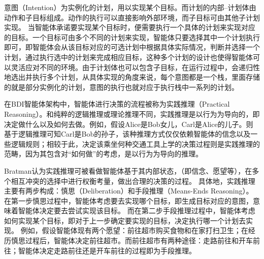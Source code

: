 意图（Intention）为实例化的计划，用以实现某个目标。而计划的内部--计划体由动作和子目标组成。动作的执行可以直接影响外部环境，而子目标可由其他子计划实现。 当智能体承诺要实现某个目标时，便需要执行一个具体的计划来实现对应的目标。一个目标可由多个不同的计划来实现，智能体只要选择其中一个计划执行即可，即智能体会从该目标对应的可选计划中根据具体实际情况，判断并选择一个计划，通过执行选中的计划来完成相应目标，这种多个计划的设计也使得智能体可以灵活应对不同的环境。由于计划体也可以包含子目标，在运行过程中，会递归性地选出并执行多个计划，从具体实现的角度来说，每个意图都是一个栈，里面存储的就是部分实例化的计划，意图的执行也就对应于执行栈中一系列的计划。

在BDI智能体架构中，智能体进行决策的流程被称为实践推理（Practical Reasoning）。和纯粹的逻辑推理或理论推理不同，实践推理是以行为为导向的，即决定做什么以及如何去做。例如，假设Alice是Bob女儿，Carl是Alice的儿子。则基于逻辑推理可知Carl是Bob的孙子，该种推理方式仅仅依赖智能体的信念以及一些逻辑规则；相较于此，决定该乘坐何种交通工具上学的决策过程则是实践推理的范畴，因为其包含对“如何做”的考虑，是以行为为导向的推理。

Bratman\cite{bratman1987intention}认为实践推理可被看做智能体基于其内部状态，（即信念、愿望等），在多个相互冲突的选择中进行权衡考量，做出合理的决策的过程。
%
具体地，实践推理主要有两步构成：慎思（Deliberation）和手段推理（Means-Ends Reasoning）。
%
在第一步慎思过程中，智能体考虑要去实现哪个目标，即生成目标对应的意图，意味着智能体决定要去尝试实现该目标。
%
而在第二步手段推理过程中，智能体考虑如何实现某个目标，即对于上一步确定要实现的目标，决定执行哪一个计划去实现。
例如，假设智能体现有两个愿望：前往超市购买食物和在家打扫卫生；在经历慎思过程后，智能体决定前往超市。而前往超市有两种途径：走路前往和开车前往；智能体决定走路前往还是开车前往的过程即为手段推理。

